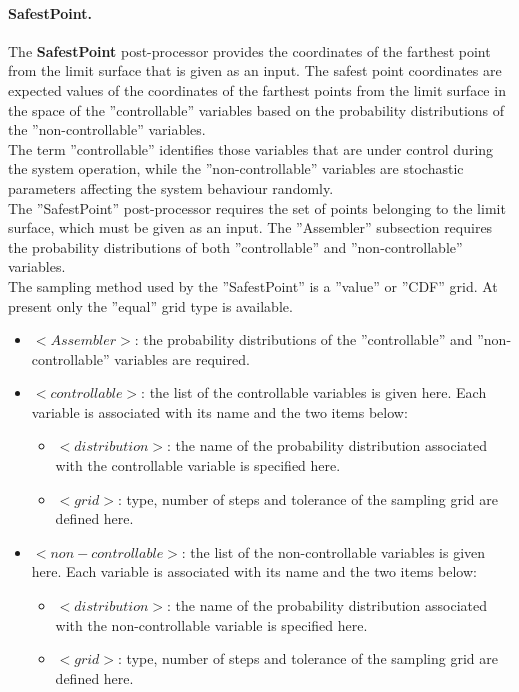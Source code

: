 \paragraph{SafestPoint.}
\label{SafestPoint}
The \textbf{SafestPoint} post-processor provides the coordinates of the farthest point from the limit surface that is given as an input.
The safest point coordinates are expected values of the coordinates of the farthest points from the limit surface in the space of the ''controllable'' variables based on the probability distributions of the ''non-controllable'' variables.
\\The term ''controllable'' identifies those variables that are under control during the system operation, while the ''non-controllable'' variables are stochastic parameters affecting the system behaviour randomly. 
\\The ''SafestPoint'' post-processor requires the set of points belonging to the limit surface, which must be given as an input. The ''Assembler'' subsection requires the probability distributions of both ''controllable'' and ''non-controllable'' variables.
\\The sampling method used by the ''SafestPoint'' is a ''value'' or ''CDF'' grid. At present only the ''equal'' grid type is available.
\begin{itemize}
	\item $<Assembler>$: the probability distributions of the ''controllable'' and ''non-controllable'' variables are required.
	\item $<controllable>$: the list of the controllable variables is given here. Each variable is associated with its name and the two items below:
		\begin{itemize}
			\item $<distribution>$: the name of the probability distribution associated with the controllable variable is specified here.
			\item $<grid>$: type, number of steps and tolerance of the sampling grid are defined here.
		\end{itemize}
	\item $<non-controllable>$: the list of the non-controllable variables is given here. Each variable is associated with its name and the two items below:
		\begin{itemize}
			\item $<distribution>$: the name of the probability distribution associated with the non-controllable variable is specified here.
			\item $<grid>$: type, number of steps and tolerance of the sampling grid are defined here.
		\end{itemize}
\end{itemize}


